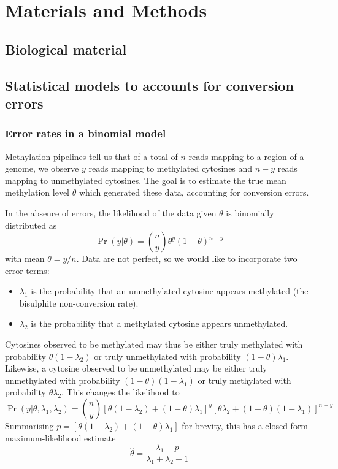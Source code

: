 \documentclass[12pt,longbibliography]{article}
\begin{document}
\section{Materials and Methods}

\subsection{Biological material}

\subsection{Statistical models to accounts for conversion errors}

\subsubsection{Error rates in a binomial model}

Methylation pipelines tell us that of a total of $n$ reads mapping to a region of a genome, we observe $y$ reads mapping to methylated cytosines and $n-y$ reads mapping to unmethylated cytosines. The goal is to estimate the true mean methylation level $\theta$ which generated these data, accounting for conversion errors.

In the absence of errors, the likelihood of the data given $\theta$ is binomially distributed as
\begin{equation}
    \label{eqn:classic-binomial}
    \Pr(y| \theta) = {n \choose y} \theta^y(1-\theta)^{n-y}
\end{equation}
with mean $\theta=y/n$.
Data are not perfect, so we would like to incorporate two error terms:
\begin{itemize}
    \item $\lambda_1$ is the probability that an unmethylated cytosine appears methylated (the bisulphite non-conversion rate).
    \item $\lambda_2$ is the probability that a methylated cytosine appears unmethylated.
\end{itemize}
Cytosines observed to be methylated may thus be either truly methylated with probability $\theta(1-\lambda_2)$ or truly unmethylated with probability $(1-\theta)\lambda_1$. Likewise, a cytosine observed to be unmethylated may be either truly unmethylated with probability $(1-\theta)(1-\lambda_1)$ or truly methylated with probability $\theta \lambda_2$.
This changes the likelihood to
\begin{equation}
    \label{eqn:binom-with-errors}
    \Pr(y | \theta, \lambda_1, \lambda_2) = 
    {n \choose y}
    [\theta(1-\lambda_2) + (1-\theta)\lambda_1]^y
    [\theta \lambda_2 + (1-\theta)(1-\lambda_1)]^{n-y}
\end{equation}
Summarising $p=[\theta(1-\lambda_2) + (1-\theta)\lambda_1]$ for brevity, this has a closed-form maximum-likelihood estimate
\begin{equation}
    \label{eqn:ml-theta}
    \hat{\theta} = \frac{\lambda_1-p}{\lambda_1 + \lambda_2 -1}
\end{equation}
\end{document}
